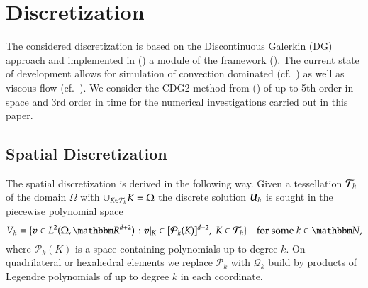 
\section{Discretization}
\label{sec:dune}
\label{seq:discretization}

The considered discretization is based on the Discontinuous Galerkin (DG) approach and 
implemented in \dunefem (\cite{dunefempaper}) a module of the
\dune framework (\cite{dunepaperII:08,dunepaperI:08}).
The current state of development allows for simulation of convection dominated 
(cf.~\cite{limiter:11}) as well as viscous flow (cf.~\cite{cdg2:10}).
We consider the CDG2 method from 
(\cite{cdg2:10}) of up to 5th order in space and 3rd order in time for the numerical
investigations carried out in this paper.

\subsection{Spatial Discretization}

The spatial discretization is derived in the following way. 
Given a tessellation ${\mathcal{T}_h}$ of the domain $\Omega$ with 
$\cup_{K \in {\mathcal{T}_h}} K = \Omega$ the 
discrete solution $\boldsymbol{U}_h$ is sought in the piecewise polynomial space 
\begin{equation}
\label{eqn:vspace}
    \phispace = \{\vecv\in L^2(\Omega,\RRR^{d+2}) \; \colon
    \vecv|_{K}\in[\mathcal{P}_k(K)]^{d+2}, \ K\in\grid\}
      \quad\textrm{for some}\;k \in \NNN, \nonumber
\end{equation}
where $\mathcal{P}_k(K)$ is a space containing polynomials up to degree
$k$. On quadrilateral or hexahedral 
elements we replace $\mathcal{P}_k$ with $\mathcal{Q}_k$ build by products of Legendre polynomials
of up to degree $k$ in each coordinate.

